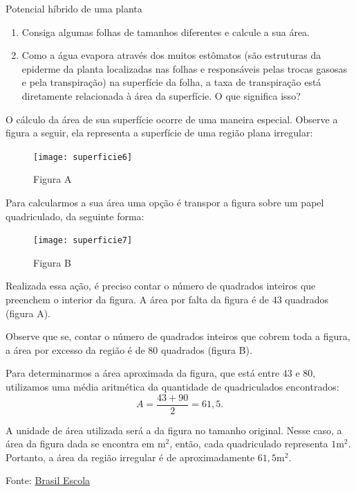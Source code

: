 \begin{task}{Potencial híbrido de uma planta}
\begin{enumerate}
  \item Consiga algumas folhas de tamanhos diferentes e calcule a sua área.
  \item Como a água evapora através dos muitos estômatos (são estruturas da epiderme da planta localizadas nas folhas e responsáveis pelas trocas gasosas e pela transpiração) na superfície da folha, a taxa de transpiração está diretamente relacionada à área da superfície. O que significa isso?
\end{enumerate}
\end{task}
\clearpage
\begin{knowledge}
O cálculo da área de sua superfície ocorre de uma maneira especial. Observe a figura a seguir, ela representa a superfície de uma região plana irregular: 

\begin{figure}[H]
\centering

\texttt{[image: superficie6]}

Figura A
\end{figure}

Para calcularmos a sua área uma opção é transpor a figura sobre um papel quadriculado, da seguinte forma: 

\begin{figure}[H]
\centering

\texttt{[image: superficie7]}

Figura B
\end{figure}

Realizada essa ação, é preciso contar o número de quadrados inteiros que preenchem o interior da figura. A área por falta da figura é de $43$ quadrados (figura A).

Observe que se, contar o número de quadrados inteiros que cobrem toda a figura, a área por excesso da região é de $80$ quadrados (figura B). 

Para determinarmos a área aproximada da figura, que está entre $43$ e $80$, utilizamos uma média aritmética da quantidade de quadriculados encontrados: 
\begin{equation*}
A=\frac{43+90}{2}=61{,}5.
\end{equation*}

A unidade de área utilizada será a da figura no tamanho original. Nesse caso, a área da figura dada se encontra em m$^2$, então, cada quadriculado representa $1$m$^2$. Portanto, a área da região irregular é de aproximadamente $61{,}5$m$^2$.

Fonte: \href{https://brasilescola.uol.com.br/matematica/calculo-de-areas-especiais.htm}{Brasil Escola}
\end{knowledge}

